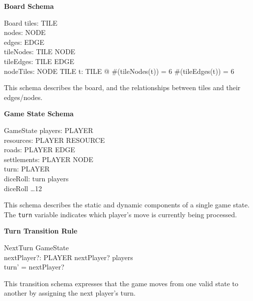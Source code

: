 \documentclass{article}
\begin{document}
\textbf{Board Schema}

\begin{schema}{Board}
    tiles:  TILE \\
    nodes:  NODE \\
    edges:  EDGE \\
    tileNodes: TILE \fun {} NODE \\  %
    tileEdges: TILE \fun {} EDGE \\  %
    nodeTiles: NODE \fun {} TILE    %
\where
    \forall t: TILE @
        \#(tileNodes(t)) = 6 \land
        \#(tileEdges(t)) = 6
\end{schema}

This schema describes the board, and the relationships between tiles and their edges/nodes. \newline

\textbf{Game State Schema}

\begin{schema}{GameState}
    players:  PLAYER \\
    resources: PLAYER \fun RESOURCE \pfun {} \\
    roads: PLAYER \fun {} EDGE \\
    settlements: PLAYER \fun {} NODE \\
    turn: PLAYER \\
    diceRoll: 
    \where
    turn \in players \\
    diceRoll  \dots 12
\end{schema}


This schema describes the static and dynamic components of a single game state.
The \texttt{turn} variable indicates which player's move is currently being processed. \newline

\textbf{Turn Transition Rule}

\begin{schema}{NextTurn}
    \Delta GameState \\
    nextPlayer?: PLAYER
    \where
    nextPlayer? \in players \\
    turn' = nextPlayer?
\end{schema}


This transition schema expresses that the game moves from one valid state to another by assigning the next player's turn. \newline
\end{document}
